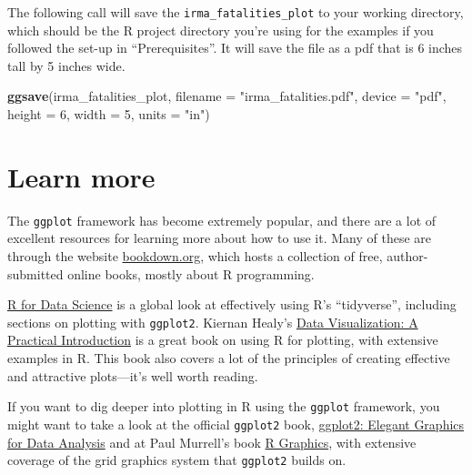 \documentclass[]{tufte-book}
\newenvironment{Shaded}{}{}
\newcommand{\DataTypeTok}[1]{\textcolor[rgb]{0.56,0.13,0.00}{#1}}
\newcommand{\DecValTok}[1]{\textcolor[rgb]{0.25,0.63,0.44}{#1}}
\newcommand{\KeywordTok}[1]{\textcolor[rgb]{0.00,0.44,0.13}{\textbf{#1}}}
\newcommand{\NormalTok}[1]{#1}
\newcommand{\StringTok}[1]{\textcolor[rgb]{0.25,0.44,0.63}{#1}}
\begin{document}
The following call will save the \texttt{irma\_fatalities\_plot} to your working directory,
which should be the R project directory you're using for the examples if you followed the
set-up in ``Prerequisites''. It will save the file as a pdf that is 6 inches tall by 5 inches
wide.

\begin{Shaded}
\begin{Highlighting}[]
\KeywordTok{ggsave}\NormalTok{(irma_fatalities_plot, }\DataTypeTok{filename =} \StringTok{"irma_fatalities.pdf"}\NormalTok{, }
    \DataTypeTok{device =} \StringTok{"pdf"}\NormalTok{, }\DataTypeTok{height =} \DecValTok{6}\NormalTok{, }\DataTypeTok{width =} \DecValTok{5}\NormalTok{, }\DataTypeTok{units =} \StringTok{"in"}\NormalTok{)}
\end{Highlighting}
\end{Shaded}

\hypertarget{learn-more}{%
\section{Learn more}\label{learn-more}}

The \texttt{ggplot} framework has become extremely popular, and there are a lot of excellent
resources for learning more about how to use it. Many of these are through the website
\href{https://bookdown.org}{bookdown.org}, which hosts a collection of free, author-submitted
online books, mostly about R programming.

\href{https://r4ds.had.co.nz/}{R for Data Science} is a global look at effectively using
R's ``tidyverse'', including sections on plotting with \texttt{ggplot2}.
Kiernan Healy's \href{https://socviz.co/index.html\#preface}{Data Visualization: A Practical Introduction}
is a great book on using R for plotting, with extensive examples in R. This book also covers a lot
of the principles of creating effective and attractive plots---it's well worth reading.

If you want to dig deeper into plotting in R using the \texttt{ggplot} framework, you might want to
take a look at the official \texttt{ggplot2} book,
\href{https://www.amazon.com/ggplot2-Elegant-Graphics-Data-Analysis/dp/0387981403}{ggplot2: Elegant Graphics for Data Analysis} and
at Paul Murrell's book \href{https://www.amazon.com/Graphics-Third-Chapman-Hall-CRC/dp/1498789056/ref=sr_1_1?keywords=paul+murrell+r+graphics\&qid=1553696167\&s=books\&sr=1-1-spell}{R Graphics}, with
extensive coverage of the grid graphics system that \texttt{ggplot2} builds on.
\end{document}
